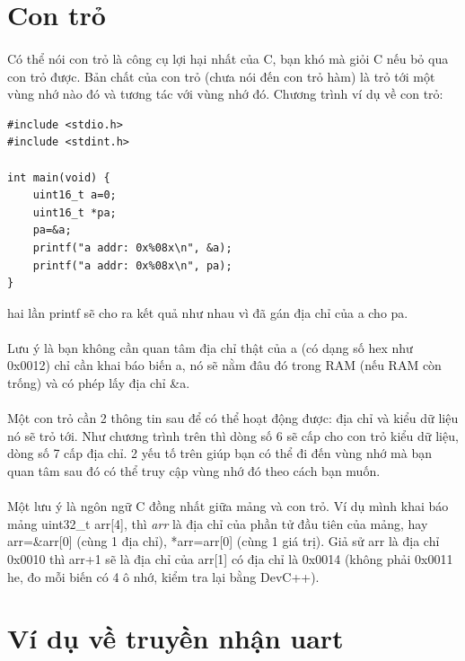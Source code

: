 \documentclass[12pt,a5paper]{book}
\begin{document}
\section{Con trỏ}
\paragraph{}
Có thể nói con trỏ là công cụ lợi hại nhất của C, bạn khó mà giỏi C nếu bỏ qua con trỏ được. Bản chất của con trỏ (chưa nói đến con trỏ hàm) là trỏ tới một vùng nhớ nào đó và tương tác với vùng nhớ đó. Chương trình ví dụ về con trỏ:
\begin{lstlisting}
#include <stdio.h>
#include <stdint.h>

int main(void) {
	uint16_t a=0;
	uint16_t *pa;
	pa=&a;
	printf("a addr: 0x%08x\n", &a);
	printf("a addr: 0x%08x\n", pa);
}
\end{lstlisting}

hai lần printf sẽ cho ra kết quả như nhau vì đã gán địa chỉ của a cho pa.
\paragraph{}
Lưu ý là bạn không cần quan tâm địa chỉ thật của a (có dạng số hex như 0x0012) chỉ cần khai báo biến a, nó sẽ nằm đâu đó trong RAM (nếu RAM còn trống) và có phép lấy địa chỉ \&a.
\paragraph{}
Một con trỏ cần 2 thông tin sau để có thể hoạt động được: địa chỉ và kiểu dữ liệu nó sẽ trỏ tới. Như chương trình trên thì dòng số 6 sẽ cấp cho con trỏ kiểu dữ liệu, dòng số 7 cấp địa chỉ. 2 yếu tố trên giúp bạn có thể đi đến vùng nhớ mà bạn quan tâm sau đó có thể truy cập vùng nhớ đó theo cách bạn muốn.
\paragraph{}
Một lưu ý là ngôn ngữ C đồng nhất giữa mảng và con trỏ. Ví dụ mình khai báo mảng uint32\_t arr[4], thì \textit{arr} là địa chỉ của phần tử đầu tiên của mảng, hay arr=\&arr[0] (cùng 1 địa chỉ), *arr=arr[0] (cùng 1 giá trị). Giả sử arr là địa chỉ 0x0010 thì arr+1 sẽ là địa chỉ của arr[1] có địa chỉ là 0x0014 (không phải 0x0011 he, đo mỗi biến có 4 ô nhớ, kiểm tra lại bằng DevC++).
\section{Ví dụ về truyền nhận uart}
\end{document}
